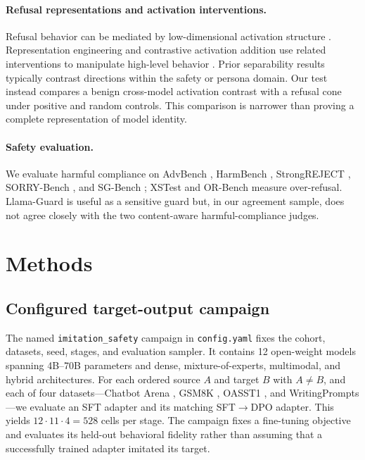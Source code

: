 \documentclass[letterpaper]{article}
\begin{document}
\paragraph{Refusal representations and activation interventions.}
Refusal behavior can be mediated by low-dimensional activation structure
\citep{arditi2024,wollschlaeger2025geometry}. Representation engineering and contrastive
activation addition use related interventions to manipulate high-level behavior
\citep{zou2023repe,panickssery2024caa}. Prior separability results typically contrast
directions within the safety or persona domain. Our test instead compares a benign
cross-model activation contrast with a refusal cone under positive and random controls.
This comparison is narrower than proving a complete representation of model identity.

\paragraph{Safety evaluation.}
We evaluate harmful compliance on AdvBench \citep{advbench2023}, HarmBench
\citep{harmbench2024}, StrongREJECT \citep{strongreject2024}, SORRY-Bench
\citep{sorrybench2025}, and SG-Bench \citep{sgbench2024}; XSTest \citep{xstest2024} and
OR-Bench \citep{orbench2025} measure over-refusal. Llama-Guard
\citep{llamaguard2023,llamaguard3-2024} is useful as a sensitive guard but, in our
agreement sample, does not agree closely with the two content-aware harmful-compliance
judges.

\section{Methods}

\subsection{Configured target-output campaign}

The named \texttt{imitation\_safety} campaign in \texttt{config.yaml} fixes the cohort,
datasets, seed, stages, and evaluation sampler. It contains 12 open-weight models
spanning 4B--70B parameters and dense, mixture-of-experts, multimodal, and hybrid
architectures. For each ordered source $A$ and target $B$
with $A\ne B$, and each of four datasets---Chatbot Arena \citep{chatbotarena2023},
GSM8K \citep{gsm8k2021}, OASST1 \citep{oasst2023}, and WritingPrompts
\citep{writingprompts2018}---we evaluate an SFT adapter and its matching SFT$\rightarrow$DPO
adapter. This yields $12\cdot11\cdot4=528$ cells per stage. The campaign fixes a
fine-tuning objective and evaluates its held-out behavioral fidelity rather than
assuming that a successfully trained adapter imitated its target.
\end{document}
